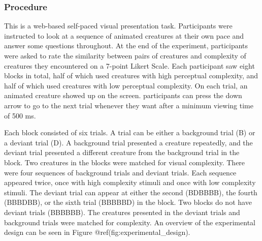 \documentclass[10pt, letterpaper]{article}
\begin{document}
\hypertarget{procedure}{%
\subsubsection{Procedure}\label{procedure}}

This is a web-based self-paced visual presentation task. Participants were instructed to look at a sequence of animated creatures at their own pace and answer some questions throughout. At the end of the experiment, participants were asked to rate the similarity between pairs of creatures and complexity of creatures they encountered on a 7-point Likert Scale. Each participant saw eight blocks in total, half of which used creatures with high perceptual complexity, and half of which used creatures with low perceptual complexity. On each trial, an animated creature showed up on the screen. participants can press the down arrow to go to the next trial whenever they want after a minimum viewing time of 500 ms.

Each block consisted of six trials. A trial can be either a background trial (B) or a deviant trial (D). A background trial presented a creature repeatedly, and the deviant trial presented a different creature from the background trial in the block. Two creatures in the blocks were matched for visual complexity. There were four sequences of background trials and deviant trials. Each sequence appeared twice, once with high complexity stimuli and once with low complexity stimuli. The deviant trial can appear at either the second (BDBBBB), the fourth (BBBDBB), or the sixth trial (BBBBBD) in the block. Two blocks do not have deviant trials (BBBBBB). The creatures presented in the deviant trials and background trials were matched for complexity. An overview of the experimental design can be seen in Figure @ref(fig:experimental\_design).
\end{document}
